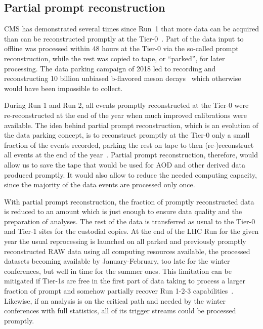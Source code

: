 \documentclass{cmspaper}
\begin{document}
\subsection{Partial prompt reconstruction}
\label{sec:partial_prompt}

CMS has demonstrated several times since Run~1 that more data can be acquired than can be reconstructed promptly at the Tier-0~\cite{Franzoni:2016cym}. Part of the data input to offline was processed within 48 hours at the Tier-0 via the so-called prompt reconstruction, while the rest was copied to tape, or ``parked'', for later processing. The data parking campaign of 2018 led to recording and reconstructing 10 billion unbiased b-flavored meson decays~\cite{Bainbridge:2730111} which otherwise would have been impossible to collect.

During Run 1 and Run 2, all events promptly reconstructed at the Tier-0 were re-reconstructed at the end of the year when much improved calibrations were available. The idea behind partial prompt reconstruction, which is an evolution of the data parking concept, is to reconstruct promptly at the Tier-0 only a small fraction of the events recorded, parking the rest on tape to then (re-)reconstruct all events at the end of the year~\cite{Software:2751565}. Partial prompt reconstruction, therefore, would allow us to save the tape that would be used for AOD and other derived data produced promptly. It would also allow to reduce the needed computing capacity, since the majority of the data events are processed only once.

With partial prompt reconstruction, the fraction of promptly reconstructed data is reduced to an amount which is just enough to ensure data quality and the preparation of analyses. The rest of the data is transferred as usual to the Tier-0 and Tier-1 sites for the custodial copies. At the end of the LHC Run for the given year the usual reprocessing is launched on all parked and previously promptly reconstructed RAW data using all computing resources available, the processed datasets becoming available by January-February, too late for the winter conferences, but well in time for the summer ones. This limitation can be mitigated if Tier-1s are free in the first part of data taking to process a larger fraction of prompt and somehow partially recover Run 1-2-3 capabilities~\cite{Hufnagel_2015}. Likewise, if an analysis is on the critical path and needed by the winter conferences with full statistics, all of its trigger streams could be processed promptly.
\end{document}
